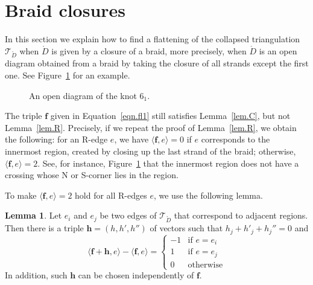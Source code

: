 \documentclass[12pt,reqno]{amsart}
\theoremstyle{definition}
\newtheorem{lemma}[theorem]{Lemma}
\def\calT{\mathcal T}
\renewcommand{\Ddot}{\mathring{D}}
\begin{document}
\section{Braid closures}
\label{sec.appb}

In this section we explain how to find a flattening of the collapsed triangulation
$\calT_{\Ddot}$ when $\Ddot$ is given by a closure of a braid, more precisely,
when $\Ddot$ is an open diagram obtained from a braid by taking the closure of all
strands except the first one. See Figure~\ref{fig.example2} for an example.

\begin{figure}[htpb!]

\caption{An open diagram of the knot $6_1$.}
\label{fig.example2}
\end{figure}
 
The triple $\boldsymbol{f}$ given in Equation~\eqref{eqn.fl1} still satisfies
Lemma~\ref{lem.C}, but not Lemma~\ref{lem.R}. Precisely, if we repeat the proof of
Lemma~\ref{lem.R}, we obtain the following: for an R-edge $e$, we have
$\langle {\boldsymbol f}, e \rangle=0$ if $e$ corresponds to the innermost region,
created by closing up the last strand of the braid; otherwise,
$\langle {\boldsymbol f}, e \rangle=2$. See, for instance, Figure~\ref{fig.example2}
that the innermost region does not have a crossing whose N or S-corner lies in
the region. 

To make $\langle {\boldsymbol f}, e \rangle=2$ hold for all R-edges $e$, we use the
following lemma.

\begin{lemma}
\label{lem.region}
Let $e_i$ and $e_j$ be two edges of $\calT_{\Ddot}$ that correspond to  adjacent regions.
Then there is a triple $\boldsymbol h=(h,h', h'')$ of vectors such that
$h_j + h'_j + h_j''=0$ and 
\begin{equation*}
\langle {\boldsymbol f + \boldsymbol h}, e \rangle -\langle {\boldsymbol f}, e \rangle
=\begin{cases}
-1 & \textrm{if } e = e_i \\
1 & \textrm{if } e = e_j \\
0 & \textrm{otherwise}
\end{cases}
\end{equation*}
In addition, such $\boldsymbol h$ can be chosen independently of $\boldsymbol f$.
\end{lemma}
\end{document}

